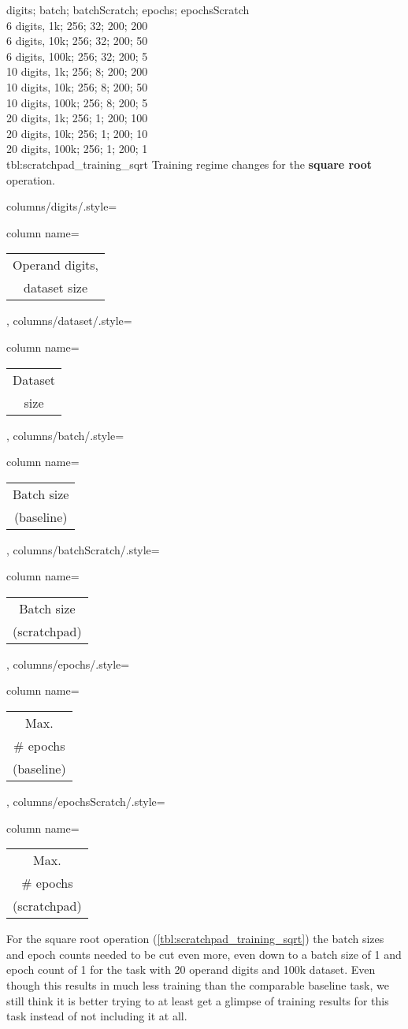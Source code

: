 {
    digits; batch; batchScratch; epochs; epochsScratch\\
    6 digits,  1k;  256; 32; 200; 200\\
    6 digits,  10k;  256; 32; 200; 50\\
    6 digits,  100k;  256; 32; 200; 5\\
    10 digits,  1k;  256; 8; 200; 200\\
    10 digits,  10k;  256; 8; 200; 50\\
    10 digits,  100k;  256; 8; 200; 5\\
    20 digits,  1k;  256; 1; 200; 100\\
    20 digits,  10k;  256; 1; 200; 10\\
    20 digits,  100k;  256; 1; 200; 1\\
}
{tbl:scratchpad_training_sqrt}
{
    Training regime changes for the \textbf{square root} operation.
}
{%
    columns/digits/.style={column name={\begin{tabular}{c}
         Operand digits, \\
         dataset size
    \end{tabular}}},
    columns/dataset/.style={column name={\begin{tabular}{c}
         Dataset \\
         size
    \end{tabular}}},
    columns/batch/.style={column name={\begin{tabular}{c}
         Batch size \\
         (baseline)
    \end{tabular}}},
    columns/batchScratch/.style={column name={\begin{tabular}{c}
         Batch size \\
         (scratchpad)
    \end{tabular}}},
    columns/epochs/.style={column name={\begin{tabular}{c}
         Max. \\
         \# epochs \\
         (baseline)
    \end{tabular}}},
    columns/epochsScratch/.style={column name={\begin{tabular}{c}
         Max. \\
         \# epochs \\
         (scratchpad)
    \end{tabular}}}
}

For the square root operation (\cref{tbl:scratchpad_training_sqrt}) the batch sizes and epoch counts needed to be cut even more, even down to a batch size of 1 and epoch count of 1 for the task with 20 operand digits and 100k dataset. Even though this results in much less training than the comparable baseline task, we still think it is better trying to at least get a glimpse of training results for this task instead of not including it at all.

